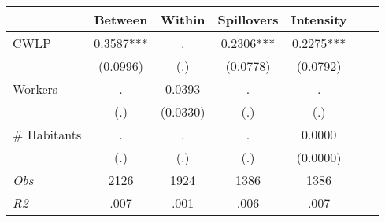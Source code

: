 \begin{tabular}{l*{6}{c}}\hline&\multicolumn{1}{c}{Between}&\multicolumn{1}{c}{Within}&\multicolumn{1}{c}{Spillovers}&\multicolumn{1}{c}{Intensity}\\ \hline 
CWLP & 0.3587*** & . & 0.2306*** & 0.2275*** \\
 & (0.0996) & (.) & (0.0778) & (0.0792) \\
Workers & . & 0.0393 & . & . \\
 & (.) & (0.0330) & (.) & (.) \\
\# Habitants & . & . & . & 0.0000 \\
  & (.) & (.) & (.) & (0.0000) \\
\hline \textit{Obs} & 2126 & 1924 & 1386 & 1386  \\ \textit{R2} & .007 & .001 & .006 & .007 \\ \hline \end{tabular}
